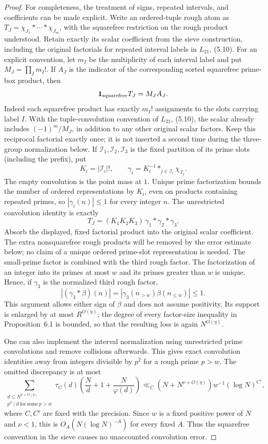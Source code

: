 \documentclass[11pt]{article}
\begin{document}
\begin{proof}
For completeness, the treatment of signs, repeated intervals, and
coefficients can be made explicit. Write an ordered-tuple rough atom
as $T_J=\chi_{J_1}*\cdots*\chi_{J_m}$, with the squarefree restriction
on the rough product understood. Retain exactly its scalar
coefficient from the sieve construction, including the original
factorials for repeated interval labels in $L_{21}$, (5.10).
For an explicit convention, let $m_I$ be the multiplicity of each
interval label and put $M_J=\prod_I m_I!$. If $A_J$ is the indicator
of the corresponding sorted squarefree prime-box product, then
\begin{equation}\label{eq:box-symmetry-normalization}
 \mathbf1_{\rm squarefree}T_J=M_J A_J.
\end{equation}
Indeed each squarefree product has exactly $m_I!$ assignments to
the slots carrying label $I$. With the tuple-convolution convention
of $L_{21}$, (5.10), the scalar already includes
$(-1)^m/M_J$, in addition to any other original scalar factors.
Keep this reciprocal factorial exactly once; it is not inserted a
second time during the three-group normalization below.
If $\mathcal I_1,\mathcal I_2,\mathcal I_3$ is the fixed partition
of its prime slots (including the prefix), put
\[
 K_i=|\mathcal I_i|!,\qquad
 \gamma_i=K_i^{-1}\mathop{*}_{j\in\mathcal I_i}\chi_{J_j}.
\]
The empty convolution is the point mass at $1$. Unique prime
factorization bounds the number of ordered representations by
$K_i$, even on products containing repeated primes, so
$|\gamma_i(n)|\le1$ for every integer $n$. The unrestricted
convolution identity is exactly
\[
 T_J=(K_1K_2K_3)\,\gamma_1*\gamma_2*\gamma_3.
\]
Absorb the displayed, fixed factorial product into the original
scalar coefficient. The extra nonsquarefree rough products will
be removed by the error estimate below; no claim of a unique
ordered prime-slot representation is needed.
The small-prime factor is combined with the third rough factor.
The factorization of an integer into its primes
at most $w$ and its primes greater than $w$ is unique. Hence, if
$\gamma_3$ is the normalized third rough factor,
\[
 |(\gamma_3*\beta)(n)|
 =|\gamma_3(n_{>w})\beta(n_{\le w})|\le1.
\]
This argument allows either sign of $\beta$ and does not assume
positivity. Its support is enlarged by at most $R^{O(\eta)}$;
the degree of every factor-size inequality in Proposition~6.1 is
bounded, so that the resulting loss is again $N^{O(\eta)}$.

One can also implement the interval normalization using unrestricted
prime convolutions and remove collisions afterwards. This gives
exact convolution identities away from integers divisible by
$p^2$ for a rough prime $p>w$. The omitted discrepancy is at most
\[
 \sum_{\substack{d\le N^{\nu+O(\eta)}\\
                  p^2\mid d\ \mathrm{for\ some}\ p>w}}
   \tau_C(d)\left(\frac{N}{d}+1+\frac{N}{\varphi(d)}\right)
 \ll_C (N+N^{\nu+O(\eta)})w^{-1}(\log N)^{C'},
\]
where $C,C'$ are fixed with the precision. Since $w$ is a fixed
positive power of $N$ and $\nu<1$, this is
$O_A(N(\log N)^{-A})$ for every fixed $A$. Thus the squarefree
convention in the sieve causes no unaccounted convolution error.


\end{proof}
\end{document}
